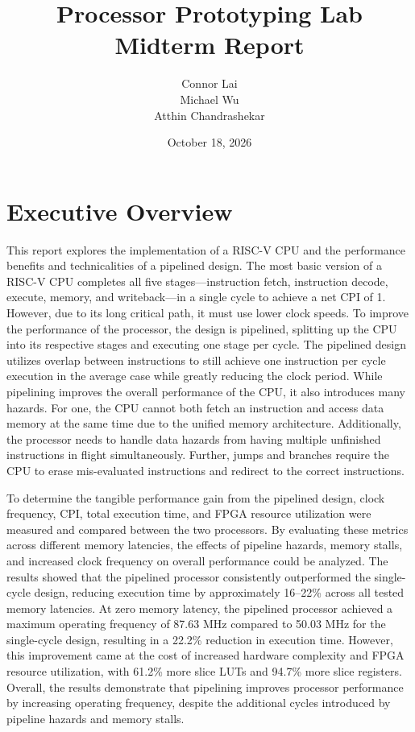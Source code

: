 \documentclass[12pt]{article}
\title{Processor Prototyping Lab \\
Midterm Report}
\author{Connor Lai \\ Michael Wu \\
Atthin Chandrashekar}
\date{October 18, 2026}
\begin{document}
\begin{titlepage}
    \centering
    \maketitle
    \vspace*{\fill}
\end{titlepage}

\section{Executive Overview}

\indent This report explores the implementation of a RISC-V CPU and the performance benefits and technicalities of a pipelined design. The most basic version of a RISC-V CPU completes all five stages---instruction fetch, instruction decode, execute, memory, and writeback---in a single cycle to achieve a net CPI of 1. However, due to its long critical path, it must use lower clock speeds. To improve the performance of the processor, the design is pipelined, splitting up the CPU into its respective stages and executing one stage per cycle. The pipelined design utilizes overlap between instructions to still achieve one instruction per cycle execution in the average case while greatly reducing the clock period. While pipelining improves the overall performance of the CPU, it also introduces many hazards. For one, the CPU cannot both fetch an instruction and access data memory at the same time due to the unified memory architecture. Additionally, the processor needs to handle data hazards from having multiple unfinished instructions in flight simultaneously. Further, jumps and branches require the CPU to erase mis-evaluated instructions and redirect to the correct instructions.

To determine the tangible performance gain from the pipelined design, clock frequency, CPI, total execution time, and FPGA resource utilization were measured and compared between the two processors. By evaluating these metrics across different memory latencies, the effects of pipeline hazards, memory stalls, and increased clock frequency on overall performance could be analyzed. The results showed that the pipelined processor consistently outperformed the single-cycle design, reducing execution time by approximately 16--22\% across all tested memory latencies. At zero memory latency, the pipelined processor achieved a maximum operating frequency of 87.63 MHz compared to 50.03 MHz for the single-cycle design, resulting in a 22.2\% reduction in execution time. However, this improvement came at the cost of increased hardware complexity and FPGA resource utilization, with 61.2\% more slice LUTs and 94.7\% more slice registers. Overall, the results demonstrate that pipelining improves processor performance by increasing operating frequency, despite the additional cycles introduced by pipeline hazards and memory stalls.
\end{document}
